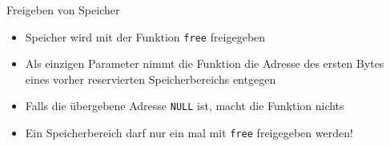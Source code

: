 \documentclass[presentation]{beamer}
\begin{document}
\begin{frame}[label={sec:org68c6d61},fragile]{Freigeben von Speicher}
 \begin{itemize}
\item Speicher wird mit der Funktion {\color{solarizedYellow}\texttt{free} }freigegeben
\item Als einzigen Parameter nimmt die Funktion die Adresse des ersten
Bytes eines vorher reservierten Speicherbereichs entgegen
\item Falls die übergebene Adresse {\color{solarizedYellow}\texttt{NULL} }ist, macht die Funktion nichts
\item Ein Speicherbereich darf nur ein mal mit {\color{solarizedYellow}\texttt{free} }freigegeben werden!
\end{itemize}
\end{frame}
\end{document}
